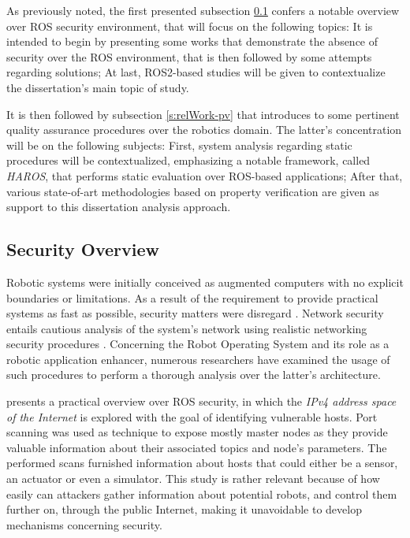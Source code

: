 As previously noted, the first presented subsection \ref{s:relWork-sec} confers a notable overview over ROS security environment, that will focus on the following topics: It is intended to begin by presenting some works that demonstrate the absence of security over the ROS environment, that is then followed by some attempts regarding solutions; At last, ROS2-based studies will be given to contextualize the dissertation's main topic of study. 

It is then followed by subsection \ref{s:relWork-pv} that introduces to some pertinent quality assurance procedures over the robotics domain. The latter's concentration will be on the following subjects: First, system analysis regarding static procedures will be contextualized, emphasizing a notable framework, called \textit{HAROS}, that performs static evaluation over ROS-based applications; After that, various state-of-art methodologies based on property verification are given as support to this dissertation analysis approach. 


\subsection{Security Overview}\label{s:relWork-sec}

Robotic systems were initially conceived as augmented computers with no explicit boundaries or limitations. As a result of the requirement to provide practical systems as fast as possible, security matters were disregard \cite{white2018procedurally}. Network security entails cautious analysis of the system's network using realistic networking security procedures \cite{marin2005network}. Concerning the Robot Operating System and its role as a robotic application enhancer, numerous researchers have examined the usage of such procedures to perform a thorough analysis over the latter's architecture.

\citeauthor*{8794451} presents a practical overview over ROS security, in which the \textit{IPv4 address space of the Internet} is explored with the goal of identifying vulnerable hosts. Port scanning was used as technique to expose mostly master nodes as they provide valuable information about their associated topics and node's parameters. The performed scans furnished information about hosts that could either be a sensor, an actuator or even a simulator. This study is rather relevant because of how easily can attackers gather information about potential robots, and control them further on, through the public Internet, making it unavoidable to develop mechanisms concerning security. 

